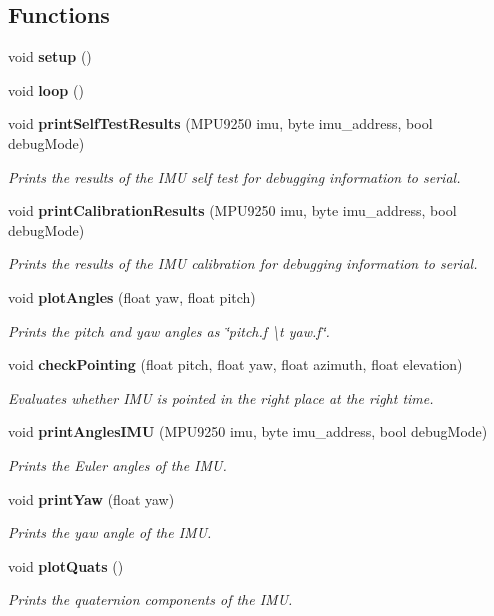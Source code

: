 \subsection*{Functions}
\begin{DoxyCompactItemize}
\item 
void \textbf{ setup} ()
\item 
void \textbf{ loop} ()
\item 
void \textbf{ print\+Self\+Test\+Results} (M\+P\+U9250 imu, byte imu\+\_\+address, bool debug\+Mode)
\begin{DoxyCompactList}\small\item\em Prints the results of the I\+MU self test for debugging information to serial. \end{DoxyCompactList}\item 
void \textbf{ print\+Calibration\+Results} (M\+P\+U9250 imu, byte imu\+\_\+address, bool debug\+Mode)
\begin{DoxyCompactList}\small\item\em Prints the results of the I\+MU calibration for debugging information to serial. \end{DoxyCompactList}\item 
void \textbf{ plot\+Angles} (float yaw, float pitch)
\begin{DoxyCompactList}\small\item\em Prints the pitch and yaw angles as \char`\"{}pitch.\+f \textbackslash{}t yaw.\+f\char`\"{}. \end{DoxyCompactList}\item 
void \textbf{ check\+Pointing} (float pitch, float yaw, float azimuth, float elevation)
\begin{DoxyCompactList}\small\item\em Evaluates whether I\+MU is pointed in the right place at the right time. \end{DoxyCompactList}\item 
void \textbf{ print\+Angles\+I\+MU} (M\+P\+U9250 imu, byte imu\+\_\+address, bool debug\+Mode)
\begin{DoxyCompactList}\small\item\em Prints the Euler angles of the I\+MU. \end{DoxyCompactList}\item 
void \textbf{ print\+Yaw} (float yaw)
\begin{DoxyCompactList}\small\item\em Prints the yaw angle of the I\+MU. \end{DoxyCompactList}\item 
void \textbf{ plot\+Quats} ()
\begin{DoxyCompactList}\small\item\em Prints the quaternion components of the I\+MU. \end{DoxyCompactList}\end{DoxyCompactItemize}
